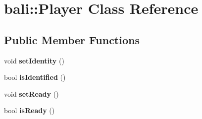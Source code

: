 \hypertarget{classbali_1_1_player}{\section{bali\-:\-:Player Class Reference}
\label{classbali_1_1_player}
}
\subsection*{Public Member Functions}
\begin{DoxyCompactItemize}
\item 
\hypertarget{classbali_1_1_player_aecdcd285713cf4b793d2305119bd410b}{void {\bfseries set\-Identity} ()}\label{classbali_1_1_player_aecdcd285713cf4b793d2305119bd410b}

\item 
\hypertarget{classbali_1_1_player_a187401e50e46a5d4ec6e4491c41a956e}{bool {\bfseries is\-Identified} ()}\label{classbali_1_1_player_a187401e50e46a5d4ec6e4491c41a956e}

\item 
\hypertarget{classbali_1_1_player_a8f0ff16f697e81d2e14397df1ec239e6}{void {\bfseries set\-Ready} ()}\label{classbali_1_1_player_a8f0ff16f697e81d2e14397df1ec239e6}

\item 
\hypertarget{classbali_1_1_player_a44724cd4802d806ba9c2a3dc382d07fb}{bool {\bfseries is\-Ready} ()}\label{classbali_1_1_player_a44724cd4802d806ba9c2a3dc382d07fb}

\end{DoxyCompactItemize}
